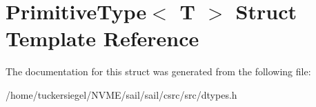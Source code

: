 \hypertarget{structPrimitiveType}{}\section{Primitive\+Type$<$ T $>$ Struct Template Reference}
\label{structPrimitiveType}


The documentation for this struct was generated from the following file\+:\begin{DoxyCompactItemize}
\item 
/home/tuckersiegel/\+N\+V\+M\+E/sail/sail/csrc/src/dtypes.\+h\end{DoxyCompactItemize}
